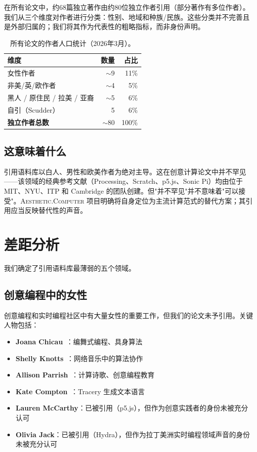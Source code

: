 \documentclass[10pt,letterpaper,twocolumn]{article}
\newcommand{\ac}{\textsc{Aesthetic.Computer}}
\begin{document}
在所有论文中，约68篇独立著作由约80位独立作者引用（部分著作有多位作者）。我们从三个维度对作者进行分类：性别、地域和种族/民族。这些分类并不完善且是外部归属的；我们将其作为代表性的粗略指标，而非身份声明。

\begin{table}[h]
\small
\centering
\begin{tabular}{lrr}
\toprule
\textbf{维度} & \textbf{数量} & \textbf{占比} \\
\midrule
女性作者 & $\sim$9 & 11\% \\
非美/英/欧作者 & $\sim$4 & 5\% \\
黑人 / 原住民 / 拉美 / 亚裔 & $\sim$5 & 6\% \\
自引（Scudder） & 5 & 6\% \\
\midrule
\textbf{独立作者总数} & $\sim$80 & 100\% \\
\bottomrule
\end{tabular}
\caption{所有论文的作者人口统计（2026年3月）。}
\label{tab:demographics}
\end{table}

\subsection{这意味着什么}

引用语料库以白人、男性和欧美作者为绝对主导。这在创意计算论文中并不罕见——该领域的经典参考文献（Processing、Scratch、p5.js、Sonic Pi）均由位于 MIT、NYU、ITP 和 Cambridge 的团队创建。但"并不罕见"并不意味着"可以接受"。\ac{} 项目明确将自身定位为主流计算范式的替代方案；其引用应当反映替代性的声音。


\section{差距分析}

我们确定了引用语料库最薄弱的五个领域。

\subsection{创意编程中的女性}

创意编程和实时编程社区中有大量女性的重要工作，但我们的论文未予引用。关键人物包括：

\begin{itemize}
  \item \textbf{Joana Chicau}~\citep{chicau2021choreo}：编舞式编程、具身算法
  \item \textbf{Shelly Knotts}~\citep{knotts2015algorithmic}：网络音乐中的算法协作
  \item \textbf{Allison Parrish}~\citep{parrish2015programming}：计算诗歌、创意编程教育
  \item \textbf{Kate Compton}~\citep{compton2015tracery}：Tracery 生成文本语言
  \item \textbf{Lauren McCarthy}：已被引用（p5.js），但作为创意实践者的身份未被充分认可
  \item \textbf{Olivia Jack}：已被引用（Hydra），但作为拉丁美洲实时编程领域声音的身份未被充分认可
\end{itemize}
\end{document}
